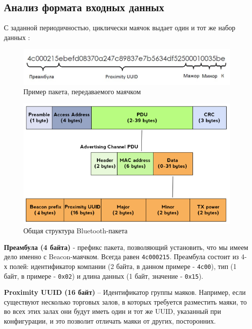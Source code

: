 \subsection{Анализ формата входных данных}

С заданной периодичностью, циклически маячок выдает один и тот же набор данных \cite{web:HabrBig, web:HabrIOS7}:

\begin{figure}[h!]
    \centering
    \includegraphics[width=\textwidth]{img/packageData2}
    \caption{Пример пакета, передаваемого маячком}
    \label{params}
\end{figure}

\begin{figure}[h!]
    \centering
    \includegraphics[width=\textwidth]{img/packageStructure}
    \caption{Общая структура Bluetooth-пакета}
\end{figure}

\textbf{Преамбула (4 байта)} - префикс пакета, позволяющий установить, что мы имеем дело именно с Beacon-маячком. Всегда равен \texttt{4c000215}. Преамбула состоит из 4-х полей: идентификатор компании (2 байта, в данном примере - \texttt{4c00}), тип (1 байт, в примере - \texttt{0x02}) и длина данных (1 байт, значение - \texttt{0x15}).

\textbf{Proximity UUID (16 байт)} – Идентификатор группы маяков. Например, если существуют несколько торговых залов, в которых требуется разместить маяки, то во всех этих залах они будут иметь один и тот же UUID, указанный при конфигурации, и это позволит отличать маяки от других, посторонних.

